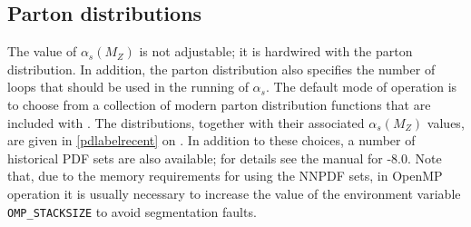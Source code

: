 

\subsection{Parton distributions}
\label{subsec:pdfsets}
The value of $\alpha_s(M_Z)$ is not adjustable; it is hardwired with the
parton distribution. In addition, the parton distribution also specifies
the number of loops that should be used in the running of $\alpha_s$.
The default mode of operation is to choose from a
collection of modern parton distribution functions that are included with
\MCFM{}.  The distributions, together with their associated $\alpha_s(M_Z)$
values, are given in \cref{pdlabelrecent} on . In addition to these
choices, a number of historical PDF sets are also available;
 for details see the manual for \MCFM{}-8.0.
Note that, 
due to the memory requirements for
using the NNPDF sets, in OpenMP operation it is usually necessary to increase
the value of the environment variable {\tt OMP\_STACKSIZE} to avoid
segmentation faults.
%
